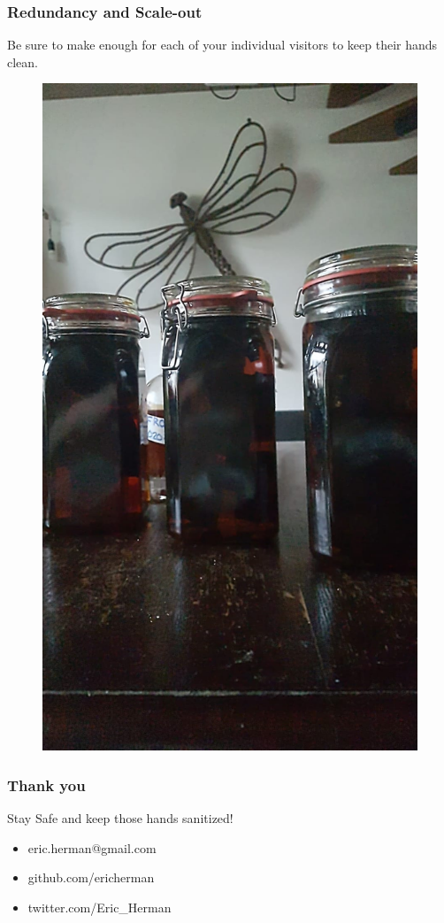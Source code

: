 \documentclass{beamer}
\begin{document}
\begin{frame}
\frametitle{Redundancy and Scale-out}
Be sure to make enough for each of your individual visitors to keep
their hands clean.
\begin{figure}
\includegraphics[height=.7\textheight]{images/scale-out.jpeg}
\end{figure}
\end{frame}

\begin{frame}
\frametitle{Thank you}
\huge{Stay Safe and keep those hands sanitized!}\newline
\begin{itemize}
\item eric.herman@gmail.com
\item github.com/ericherman
\item twitter.com/Eric\_Herman
\end{itemize}
\end{frame}
\end{document}
